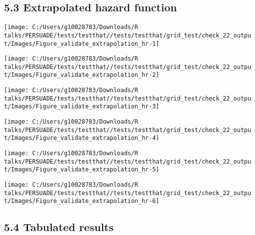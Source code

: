 \documentclass[
]{article}
\begin{document}
\clearpage

\subsection{5.3 Extrapolated hazard
function}\label{extrapolated-hazard-function}

\begin{flushleft}\texttt{[image: C:/Users/g10028783/Downloads/R talks/PERSUADE/tests/testthat//tests/testthat/grid\_test/check\_22\_output/Images/Figure\_validate\_extrapolation\_hr-1]} \end{flushleft}

\begin{flushleft}\texttt{[image: C:/Users/g10028783/Downloads/R talks/PERSUADE/tests/testthat//tests/testthat/grid\_test/check\_22\_output/Images/Figure\_validate\_extrapolation\_hr-2]} \end{flushleft}

\begin{flushleft}\texttt{[image: C:/Users/g10028783/Downloads/R talks/PERSUADE/tests/testthat//tests/testthat/grid\_test/check\_22\_output/Images/Figure\_validate\_extrapolation\_hr-3]} \end{flushleft}

\begin{flushleft}\texttt{[image: C:/Users/g10028783/Downloads/R talks/PERSUADE/tests/testthat//tests/testthat/grid\_test/check\_22\_output/Images/Figure\_validate\_extrapolation\_hr-4]} \end{flushleft}

\begin{flushleft}\texttt{[image: C:/Users/g10028783/Downloads/R talks/PERSUADE/tests/testthat//tests/testthat/grid\_test/check\_22\_output/Images/Figure\_validate\_extrapolation\_hr-5]} \end{flushleft}

\begin{flushleft}\texttt{[image: C:/Users/g10028783/Downloads/R talks/PERSUADE/tests/testthat//tests/testthat/grid\_test/check\_22\_output/Images/Figure\_validate\_extrapolation\_hr-6]} \end{flushleft}

\clearpage

\subsection{5.4 Tabulated results}\label{tabulated-results}
\end{document}
